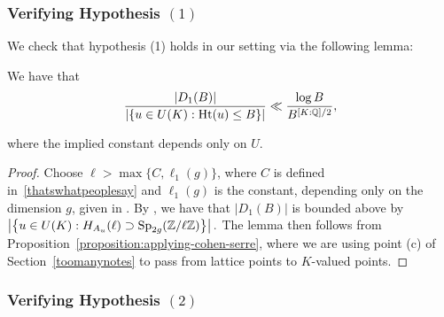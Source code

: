 \subsubsection{Verifying Hypothesis $(1)$}
We check that hypothesis (1) holds in our setting via the following lemma:
	\begin{lemma}\label{lemma:davide-1}
		 We have that
		 \begin{align}
			 \label{equation:bound-d1}
			\frac{|D_1(B)|}{|\{u \in U(K) : \operatorname{Ht}(u) \le B\}|} \ll \frac{\log B}{B^{[K:\mathbb Q]/2}},
		 \end{align}
		
        where the implied constant depends only on $U$.
	\end{lemma}
	\begin{proof}
Choose $\ell > \max\{C, \ell_1(g)\}$, where $C$ is defined in~\eqref{thatswhatpeoplesay} and $\ell_1(g)$ is the constant, depending only on the dimension $g$, given in
\cite[Proposition 5]{ellenbergEHK:non-simple-abelian-varieties-in-a-family}.
By
\cite[Proposition 5]{ellenbergEHK:non-simple-abelian-varieties-in-a-family}, we have that $|D_1(B)|$ is bounded above by $\left| \left\{ u \in U(K) : H_{A_u}(\ell) \supset \operatorname{Sp}_{2g}(\mathbb Z/\ell \mathbb Z) \right\}\right|.$
The lemma then follows from
Proposition~\ref{proposition:applying-cohen-serre},
where we are using point (c) of Section~\ref{toomanynotes} to pass from lattice points to $K$-valued points.
	\end{proof}

\subsubsection{Verifying Hypothesis $(2)$}

